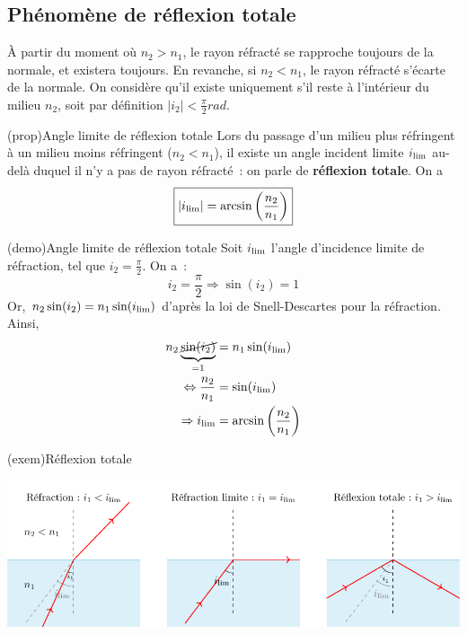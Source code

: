 \documentclass[../../main/main.tex]{subfiles}
\begin{document}
\newpage

\subsection{Phénomène de réflexion totale}

À partir du moment où $n_2 > n_1$, le rayon réfracté se rapproche toujours de la
normale, et existera toujours. En revanche, si $n_2 < n_1$, le rayon réfracté
s'écarte de la normale. On considère qu'il existe uniquement s'il reste à
l'intérieur du milieu $n_2$, soit par définition $|i_2| <
	\frac{\pi}{2}\si{rad}$.

\begin{tcbraster}[raster columns=3, raster equal height=rows]
	\begin{tcb}[label=prop:ilim, valign=center](prop){Angle limite de réflexion
				totale}
		Lors du passage d'un milieu plus réfringent à un milieu moins réfringent
		($n_2 < n_1$), il existe un angle incident limite $i_{\rm lim}$ au-delà
		duquel il n'y a pas de rayon réfracté~: on parle de \textbf{réflexion
			totale}. On a
		\[ \boxed{|i_{\rm lim}| = \arcsin \left( \frac{n_2}{n_1} \right)}\]
	\end{tcb}
	\begin{tcb}[label=demo:ilim, raster multicolumn=2](demo){Angle limite de
				réflexion totale}
		Soit $i_{\rm lim}$ l'angle d'incidence limite de réfraction, tel que
		$i_2 = \frac{\pi}{2}$. On a~:
		\begin{equation*}
			i_2 = \frac{\pi}{2} \Rightarrow \sin(i_2) = 1
		\end{equation*}
		Or, $n_2\sin(i_2) = n_1\sin(i_{\rm lim})$ d'après la loi de
		Snell-Descartes pour la réfraction. Ainsi,
		\begin{align*}
			n_2 \underbrace{\cancel{\sin(i_2)}}_{=1} & = n_1\sin(i_{\rm lim})                   \\
			\Leftrightarrow \frac{n_2}{n_1}          & = \sin(i_{\rm lim})                      \\
			\Rightarrow i_{\rm lim}                  & = \arcsin \left( \frac{n_2}{n_1} \right)
		\end{align*}
	\end{tcb}
\end{tcbraster}

\begin{tcb}[label=exem:ilim](exem){Réflexion totale}
	\begin{center}
		\includegraphics[width=\linewidth]{snell_refl_tot.pdf}
		\captionsetup{justification=centering}
		\label{fig:refl_tot}
	\end{center}
\end{tcb}
\end{document}
